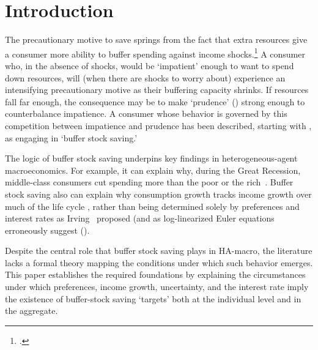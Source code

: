 \documentclass[BufferStockTheory]{subfiles}
\begin{document}
\section{Introduction}\label{sec:intro}
\setcounter{page}{0}

% 


The precautionary motive to save springs from the fact that extra resources give a consumer more ability to buffer spending against income shocks.\footnote{\cite{CarrollKimballPSPW}.}  A consumer who, in the absence of shocks, would be `impatient' enough to want to spend down resources, will (when there are shocks to worry about) experience an intensifying precautionary motive as their buffering capacity shrinks.
If resources fall far enough, the consequence may be to make `prudence' (\cite{kimball:standardra}) strong enough to counterbalance impatience.
A consumer whose behavior is governed by this competition between impatience and prudence has been described, starting with \cite{deatonLiqConstr}, as engaging in `buffer stock saving.'


The logic of buffer stock saving underpins key findings in heterogeneous-agent macroeconomics.
For example, it can explain why, during the Great Recession, middle-class consumers cut spending more than the poor or the rich~\citep{kmpHandbook}.
Buffer stock saving also can explain why consumption growth tracks income growth over much of the life cycle \citep{carrollBSLCPIH}, rather than being determined solely by preferences and interest rates as Irving~\cite{fisherInterestTheory} proposed (and as log-linearized Euler equations erroneously suggest (\cite{carroll:death}).


Despite the central role that buffer stock saving plays in HA-macro, the literature lacks a formal theory mapping the conditions under which such behavior emerges.
This paper establishes the required foundations by explaining the circumstances under which preferences, income growth, uncertainty, and the interest rate imply the existence of buffer-stock saving `targets' both at the individual level and in the aggregate.

% 
\end{document}
